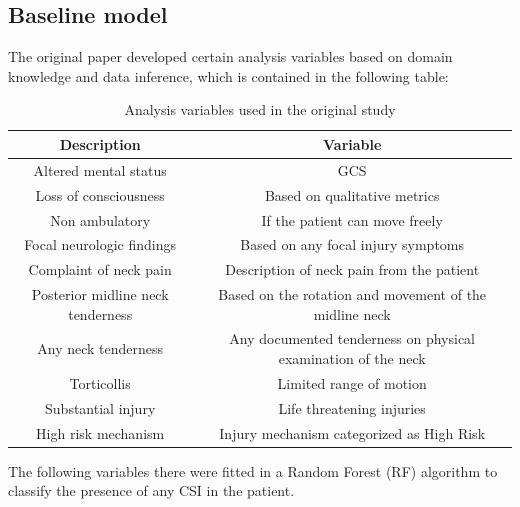 \documentclass[10pt,letterpaper]{article}
\begin{document}
\subsection{Baseline model}
The original paper \cite{leonard2011factors} developed certain analysis variables based on domain knowledge and data inference, which is contained in the following table:

\begin{table}[H]
\centering
\begin{tabular}{cc}
\textbf{Description}              & \textbf{Variable}                                             \\ \hline
Altered mental status             & GCS                                                           \\
Loss of consciousness             & Based on qualitative metrics                                                              \\
Non ambulatory                    & If the patient can move freely                                                              \\
Focal neurologic findings        &  Based on any focal injury symptoms                                                             \\
Complaint of neck pain            &  Description of neck pain from the patient                                                             \\
Posterior midline neck tenderness &  Based on the rotation and movement of the midline neck                                                             \\
Any neck tenderness               & Any documented tenderness on physical examination of the neck \\
Torticollis                       & Limited range of motion                                       \\
Substantial injury                & Life threatening injuries                                     \\
High risk mechanism               & Injury mechanism categorized as High Risk                     \\ \hline
\end{tabular}
\caption{Analysis variables used in the original study \cite{leonard2011factors}}
\label{tab:base_variables}
\end{table}

The following variables there were fitted in a Random Forest (RF) algorithm to classify the presence of any CSI in the patient. 
\end{document}
